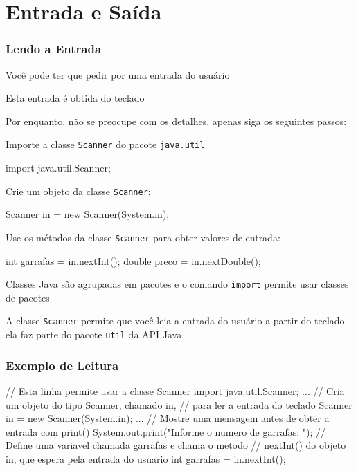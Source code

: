\documentclass[xcolor={dvipsnames,table},aspectratio=169]{beamer}
\begin{document}
\section{Entrada e Saída}

\begin{frame}[fragile]\frametitle{Lendo a Entrada}
\begin{itemize}
{\scriptsize
	\item Você pode ter que pedir por uma entrada do usuário
	\item Esta entrada é obtida do teclado
	\item Por enquanto, não se preocupe com os detalhes, apenas siga os seguintes passos:
	\begin{enumerate}
{\scriptsize
		\item Importe a classe \texttt{Scanner} do pacote \texttt{java.util}
{\scriptsize
\begin{javacode}
import java.util.Scanner;
\end{javacode}
}
		\item Crie um objeto da classe \texttt{Scanner}:
{\scriptsize
\begin{javacode}
Scanner in = new Scanner(System.in);
\end{javacode}
}
		\item Use os métodos da classe \texttt{Scanner} para obter valores de entrada:
{\scriptsize
\begin{javacode}
int garrafas = in.nextInt();
double preco = in.nextDouble();
\end{javacode}
}
}
	\end{enumerate}
	\item Classes Java são agrupadas em pacotes e o comando \texttt{import} permite usar classes de pacotes
	\item A classe \texttt{Scanner} permite que você leia a entrada do usuário a partir do teclado - ela faz parte do pacote \texttt{util} da API Java
}
\end{itemize}
\end{frame}

\begin{frame}[fragile]\frametitle{Exemplo de Leitura}
\begin{javacode}
// Esta linha permite usar a classe Scanner
import java.util.Scanner;
...
// Cria um objeto do tipo Scanner, chamado in,
// para ler a entrada do teclado
Scanner in = new Scanner(System.in);
...
// Mostre uma mensagem antes de obter a entrada com print()
System.out.print("Informe o numero de garrafas: ");
// Define uma variavel chamada garrafas e chama o metodo
// nextInt() do objeto in, que espera pela entrada do usuario
int garrafas = in.nextInt();
\end{javacode}
\end{frame}
\end{document}
